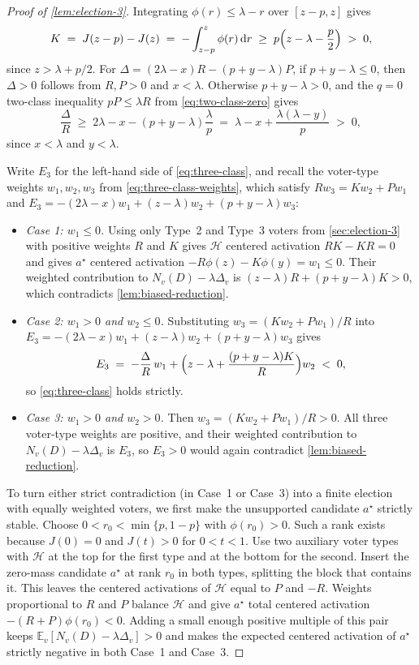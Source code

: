 \documentclass[11pt]{article}
\numberwithin{equation}{section}
\theoremstyle{plain}
\theoremstyle{definition}
\newcommand{\E}{\mathbb{E}}
\newcommand{\1}{\mathbf{1}}
\newcommand{\calH}{\mathcal{H}}
\begin{document}
\begin{proof}[Proof of {\cref{lem:election-3}}]
Integrating $\phi(r) \le \lambda - r$ over $[z - p, z]$ gives
\[
  K \;=\; J(z - p) - J(z) \;=\; -\int_{z-p}^z \phi(r)\,\mathrm{d}r \;\ge\; p\Bigl(z - \lambda - \frac{p}{2}\Bigr) \;>\; 0,
\]
since $z > \lambda + p/2$. For $\Delta = (2\lambda - x)R - (p + y - \lambda)P$, if $p + y - \lambda \le 0$, then $\Delta > 0$ follows from $R, P > 0$ and $x < \lambda$. Otherwise $p + y - \lambda > 0$, and the $q = 0$ two-class inequality $p P \le \lambda R$ from \cref{eq:two-class-zero} gives
\[
  \frac{\Delta}{R} \;\ge\; 2\lambda - x - (p + y - \lambda)\frac{\lambda}{p}
  \;=\; \lambda - x + \frac{\lambda(\lambda - y)}{p} \;>\; 0,
\]
since $x < \lambda$ and $y < \lambda$.

Write $E_3$ for the left-hand side of \cref{eq:three-class}, and recall the voter-type weights $w_1, w_2, w_3$ from \cref{eq:three-class-weights}, which satisfy $R w_3 = K w_2 + P w_1$ and $E_3 = -(2\lambda - x)w_1 + (z - \lambda)w_2 + (p + y - \lambda)w_3$:
\begin{itemize}
  \item \emph{Case 1: $w_1 \le 0$.} Using only Type~2 and Type~3 voters from \cref{sec:election-3} with positive weights $R$ and $K$ gives $\calH$ centered activation $R K - K R = 0$ and gives $a^\star$ centered activation $-R\phi(z) - K\phi(y) = w_1 \le 0$. Their weighted contribution to $N_v(D) - \lambda\Delta_v$ is $(z - \lambda)R + (p + y - \lambda)K > 0$, which contradicts \cref{lem:biased-reduction}.
  \item \emph{Case 2: $w_1 > 0$ and $w_2 \le 0$.} Substituting $w_3 = (K w_2 + P w_1)/R$ into $E_3 = -(2\lambda - x)w_1 + (z - \lambda)w_2 + (p + y - \lambda)w_3$ gives
  \[
    E_3 \;=\; -\frac{\Delta}{R}\,w_1 + \Bigl(z - \lambda + \frac{(p + y - \lambda)K}{R}\Bigr)w_2 \;<\; 0,
  \]
  so \cref{eq:three-class} holds strictly.
  \item \emph{Case 3: $w_1 > 0$ and $w_2 > 0$.} Then $w_3 = (K w_2 + P w_1)/R > 0$. All three voter-type weights are positive, and their weighted contribution to $N_v(D) - \lambda\Delta_v$ is $E_3$, so $E_3 > 0$ would again contradict \cref{lem:biased-reduction}.
\end{itemize}

To turn either strict contradiction (in Case~1 or Case~3) into a finite election with equally weighted voters, we first make the unsupported candidate $a^\star$ strictly stable. Choose $0<r_0<\min\{p,1-p\}$ with $\phi(r_0)>0$. Such a rank exists because $J(0)=0$ and $J(t)>0$ for $0<t<1$. Use two auxiliary voter types with $\calH$ at the top for the first type and at the bottom for the second. Insert the zero-mass candidate $a^\star$ at rank $r_0$ in both types, splitting the block that contains it. This leaves the centered activations of $\calH$ equal to $P$ and $-R$. Weights proportional to $R$ and $P$ balance $\calH$ and give $a^\star$ total centered activation $-(R+P)\phi(r_0)<0$. Adding a small enough positive multiple of this pair keeps $\E_v[N_v(D) - \lambda\Delta_v] > 0$ and makes the expected centered activation of $a^\star$ strictly negative in both Case~1 and Case~3.


\end{proof}
\end{document}
